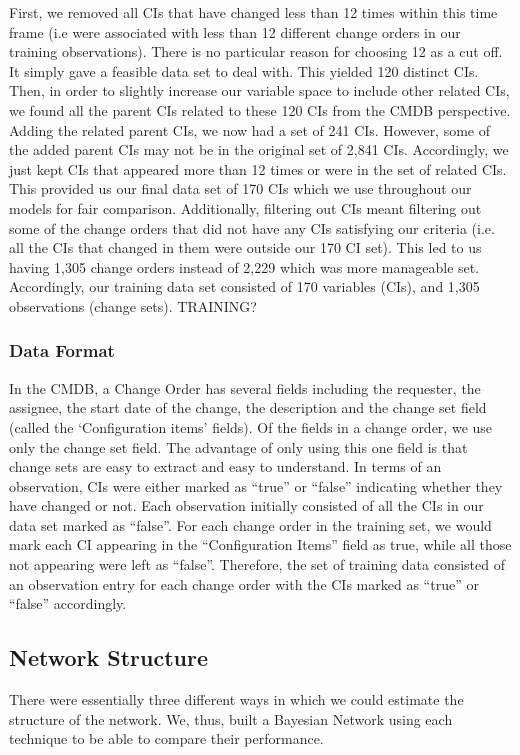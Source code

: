 \documentclass[10pt,twocolumn,letterpaper]{article}
\begin{document}
First, we removed all CIs that have changed less than 12 times within this time frame  (i.e were associated with less than 12 different change orders in our
training observations). There is no particular reason for choosing 12 as a cut off. It simply gave a feasible data set to deal with. This yielded 120 distinct
CIs. Then, in order to slightly increase our variable space to include other related CIs, we found all the parent CIs related to these 120 CIs from the CMDB
perspective. Adding the related parent CIs, we now had a set of 241 CIs. However, some of the added parent CIs may not be in the original set of 2,841 CIs.
Accordingly, we just kept CIs that appeared more than 12 times or were in the set of related CIs. This provided us our final data set of 170 CIs which we use
throughout our models for fair comparison. Additionally, filtering out CIs meant filtering out some of the change orders that did not have any CIs satisfying
our criteria (i.e. all the CIs that changed in them were outside our 170 CI set). This led to us having 1,305 change orders instead of 2,229 which was more
manageable set. Accordingly, our training data set consisted of 170 variables (CIs), and 1,305 observations (change sets).  TRAINING?

\subsubsection*{Data Format}
\label{sec:format}

In the CMDB, a Change Order has several fields including the requester, the assignee, the start date of the change, the description and the change set field
(called the `Configuration items' fields). Of the fields in a change order, we use only the change set field. The advantage of only using this one field is that
change sets are easy to extract and easy to understand. In terms of an observation, CIs were either marked as ``true'' or ``false'' indicating whether they
have changed or not. Each observation initially consisted of all the CIs in our data set marked as ``false''. For each change order in the training set, we
would
mark each CI appearing in the ``Configuration Items'' field as true, while all those not appearing were left as ``false''. Therefore, the set of training
data consisted of an observation entry for each change order with the CIs marked as ``true'' or ``false'' accordingly.

\subsection{Network Structure}
\label{sec:structure}
There were essentially three different ways in which we could estimate the structure of the network. We, thus, built a Bayesian Network using each technique to
be able to compare their performance.
\end{document}

